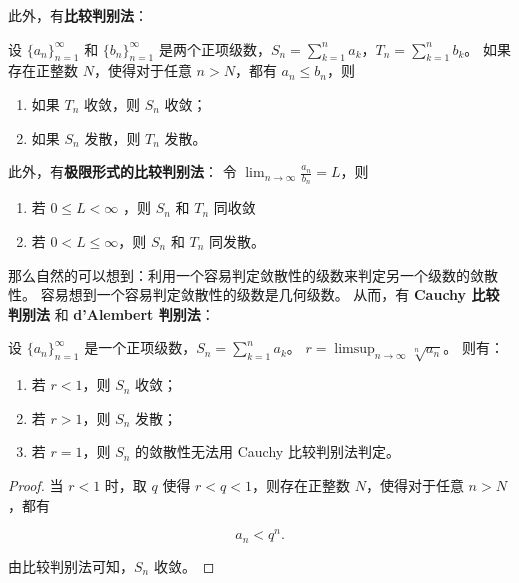 此外，有\textbf{比较判别法}：

\begin{theorem}[比较判别法]\label{thm:comparison-test}
  设 $\{a_n\}_{n=1}^{\infty}$ 和 $\{b_n\}_{n=1}^{\infty}$ 是两个正项级数，$S_n = \sum_{k=1}^{n} a_k$，$T_n = \sum_{k=1}^{n} b_k$。
  如果存在正整数 $N$，使得对于任意 $n > N$，都有 $a_n \leq b_n$，则
  \begin{enumerate}
    \item 如果 $T_n$ 收敛，则 $S_n$ 收敛；
    \item 如果 $S_n$ 发散，则 $T_n$ 发散。
  \end{enumerate}
  此外，有\textbf{极限形式的比较判别法}：
  令 $\lim_{n \to \infty} \frac{a_n}{b_n} = L$，则
  \begin{enumerate}
    \item 若 $0 \leq L < \infty$ ，则 $S_n$ 和 $T_n$ 同收敛
    \item 若 $0 < L \leq \infty$，则 $S_n$ 和 $T_n$ 同发散。
  \end{enumerate}
\end{theorem}

那么自然的可以想到：利用一个容易判定敛散性的级数来判定另一个级数的敛散性。
容易想到一个容易判定敛散性的级数是几何级数。
从而，有 \textbf{Cauchy 比较判别法} 和 \textbf{d'Alembert 判别法}：

\begin{theorem}\label{thm:cauchy-comparison-test}
  设 $\{a_n\}_{n=1}^{\infty}$ 是一个正项级数，$S_n = \sum_{k=1}^{n} a_k$。
  $r = \limsup_{n \to \infty} \sqrt[n]{a_n}$。
  则有：

  \begin{enumerate}
    \item 若 $r < 1$，则 $S_n$ 收敛；
    \item 若 $r > 1$，则 $S_n$ 发散；
    \item 若 $r = 1$，则 $S_n$ 的敛散性无法用 Cauchy 比较判别法判定。
  \end{enumerate}

\end{theorem}

\begin{proof}
  当 $r < 1$ 时，取 $q$ 使得 $r < q < 1$，则存在正整数 $N$，使得对于任意 $n > N$，都有

  \begin{equation*}
    a_n < q^n.
  \end{equation*}

  由比较判别法可知，$S_n$ 收敛。
\end{proof}

